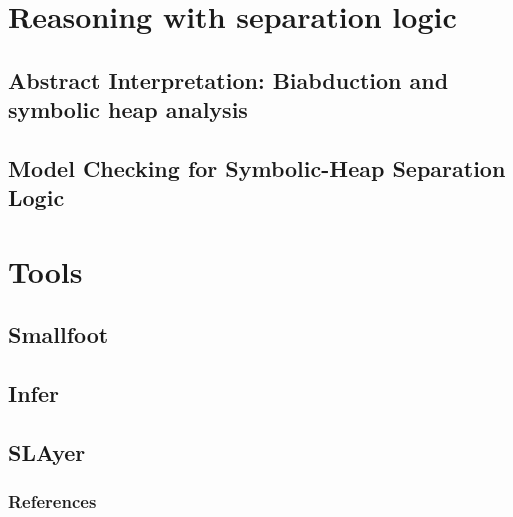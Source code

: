 \documentclass{beamer}
\begin{document}
    \section{Reasoning with separation logic}
    \subsection{Abstract Interpretation: Biabduction and symbolic heap  analysis}
    \subsection{Model Checking for Symbolic-Heap Separation Logic }
    \section{Tools}
    \subsection{Smallfoot}
    \subsection{Infer}
    \subsection{SLAyer}
    \begin{frame}[allowframebreaks]
     
        \nocite{*}
        \frametitle{References}
        
        
    \end{frame}
\end{document}
